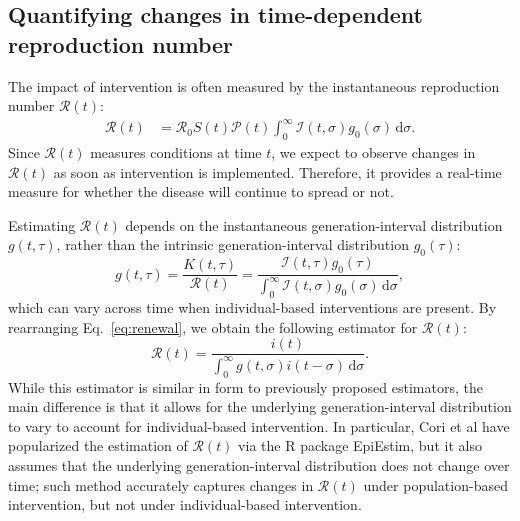 \documentclass[12pt]{article}
\newcommand{\eref}[1]{Eq.~\ref{eq:#1}}
\newcommand{\RR}{\ensuremath{{\mathcal R}}\xspace}
\newcommand{\dd}[1]{\ensuremath{\, \mathrm{d}#1}}
\newcommand{\dsigma}{\dd{\sigma}}
\newcommand{\PP}{{\mathcal P}}
\newcommand{\II}{{\mathcal I}}
\begin{document}
\subsection{Quantifying changes in time-dependent reproduction number}

The impact of intervention is often measured by the instantaneous reproduction number $\RR(t)$:
\begin{align}
\RR(t) &= \RR_0 S(t) \PP(t) \int_0^\infty \II(t,\sigma) g_0(\sigma) \dsigma.
\label{eq:rt}
\end{align}
Since $\RR(t)$ measures conditions at time $t$, we expect to observe changes in $\RR(t)$ as soon as intervention is implemented.
Therefore, it provides a real-time measure for whether the disease will continue to spread or not.

Estimating $\RR(t)$ depends on the instantaneous generation-interval distribution $g(t, \tau)$, rather than the intrinsic generation-interval distribution $g_0(\tau)$:
\begin{equation}
g(t, \tau) = \frac{K(t, \tau)}{\RR(t)} = \frac{\II(t,\tau) g_0(\tau)}{\int_0^\infty \II(t,\sigma) g_0(\sigma) \dsigma},
\end{equation}
which can vary across time when individual-based interventions are present.
By rearranging \eref{renewal}, we obtain the following estimator for $\RR(t)$:
\begin{equation}
\RR(t) = \frac{i(t)}{\int_0^\infty g(t, \sigma) i(t-\sigma) \dsigma}.
\end{equation}
While this estimator is similar in form to previously proposed estimators, the main difference is that it allows for the underlying generation-interval distribution to vary to account for individual-based intervention.
In particular, Cori et al have popularized the estimation of $\RR(t)$ via the R package EpiEstim, but it also assumes that the underlying generation-interval distribution does not change over time; 
such method accurately captures changes in $\RR(t)$ under population-based intervention, but not under individual-based intervention.
\end{document}

